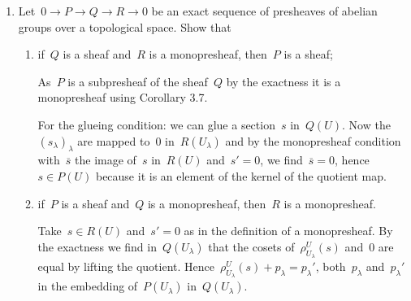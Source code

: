 \documentclass[a4paper,11pt,oneside,openany,article]{memoir}
\begin{document}
\begin{enumerate}



  \item Let~$0\to P\to Q\to R\to 0$ be an exact sequence of presheaves of abelian groups over a topological space. Show that
    \begin{enumerate}
      \item if~$Q$ is a sheaf and~$R$ is a monopresheaf, then~$P$ is a sheaf;

        \begin{solution}
          As~$P$ is a subpresheaf of the sheaf~$Q$ by the exactness it is a monopresheaf using Corollary 3.7.

          For the glueing condition: we can glue a section~$s$ in~$Q(U)$. Now the~$(s_\lambda)_\lambda$ are mapped to~$0$ in~$R(U_\lambda)$ and by the monopresheaf condition with~$\overline{s}$ the image of~$s$ in~$R(U)$ and~$s'=0$, we find~$\overline{s}=0$, hence~$s\in P(U)$ because it is an element of the kernel of the quotient map.
        \end{solution}

      \item if~$P$ is a sheaf and~$Q$ is a monopresheaf, then~$R$ is a monopresheaf.

        \begin{solution}
          Take~$s\in R(U)$ and~$s'=0$ as in the definition of a monopresheaf. By the exactness we find in~$Q(U_\lambda)$ that the cosets of~$\rho^U_{U_\lambda}(s)$ and~$0$ are equal by lifting the quotient. Hence~$\rho^U_{U_\lambda}(s)+p_\lambda=p_\lambda'$, both~$p_\lambda$ and~$p_\lambda'$ in the embedding of~$P(U_\lambda)$ in~$Q(U_\lambda)$.


\end{solution}
\end{enumerate}
\end{enumerate}
\end{document}
